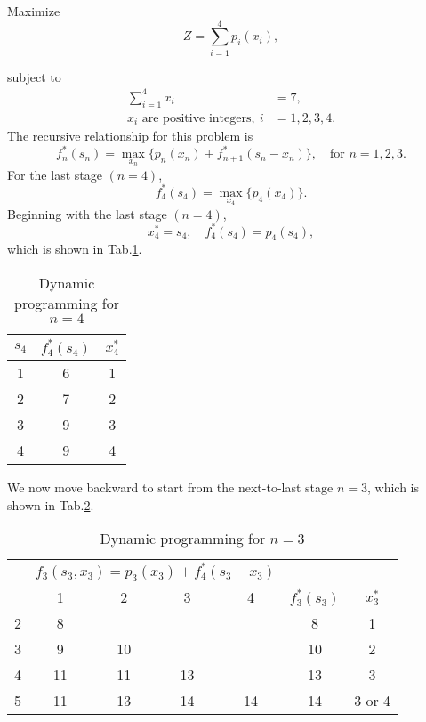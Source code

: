 \documentclass[a4paper]{article}
\begin{document}
\begin{enumerate}
\begin{solution}
	Maximize $$Z=\sum_{i=1}^4 p_i(x_i),$$
	
	subject to
	\begin{equation*}
		\begin{aligned}
			\sum_{i=1}^4x_i&=7,\\		
			x_i \text{ are positive integers},\ i&=1,2,3,4.
		\end{aligned}
	\end{equation*}
	The recursive relationship for this problem is
	\begin{equation*}
		f_n^*(s_n)=\max\limits_{x_n}\{p_n(x_n)+f_{n+1}^*(s_n-x_n)\},
		\quad \text{for } n=1,2,3.
	\end{equation*}
	For the last stage $(n=4)$,
	\begin{equation*}
		f_4^*(s_4)=\max\limits_{x_4} \{p_4(x_4)\}.
	\end{equation*}
	Beginning with the last stage $(n=4)$,
	\begin{equation*}
		x_4^*=s_4,\quad f_4^*(s_4)=p_4(s_4),
	\end{equation*}
	which is shown in Tab.\ref{tabn4}.
	  \begin{table}[H]
	  	\centering
	  	\caption{Dynamic programming for $n=4$}
	  	\label{tabn4}
	  	\begin{tabular}{ccc}
	  		\toprule[1.5pt]
	  		$s_4$&$f_4^*(s_4)$&$x_4^*$\\
	  		\midrule
			1&6&1\\
			2&7&2\\
			3&9&3\\
			4&9&4\\
	  		\bottomrule[1.5pt]
	  	\end{tabular}
  	\end{table}
	
	We now move backward to start from the next-to-last stage $n=3$, which is shown in Tab.\ref{tabn3}.
	\begin{table}[H]
	  	\centering
	  	\caption{Dynamic programming for $n=3$}
	  	\label{tabn3}
	  	\begin{tabular}{ccccccc}
	  		\toprule[1.5pt]
	  		&\multicolumn{4}{c}{$f_3(s_3,x_3)=p_3(x_3)+f_4^*(s_3-x_3)$}&\\
	  		\cmidrule{2-5}
	  		\diagbox[width=3em]{$s_3$}{$x_3$}&\hspace*{0.4cm}1\hspace*{0.4cm}&\hspace*{0.4cm}2\hspace*{0.4cm}&\hspace*{0.4cm}3\hspace*{0.4cm}&\hspace*{0.4cm}4\hspace*{0.4cm}&$f_3^*(s_3)$&$x_3^*$\\
	  		\midrule
			2&8&&&&8&1\\
			3&9&10&&&10&2\\
			4&11&11&13&&13&3\\
			5&11&13&14&14&14&3 or 4\\
	  		\bottomrule[1.5pt]
	  	\end{tabular}
  	\end{table}
  	

\end{solution}
\end{enumerate}
\end{document}
